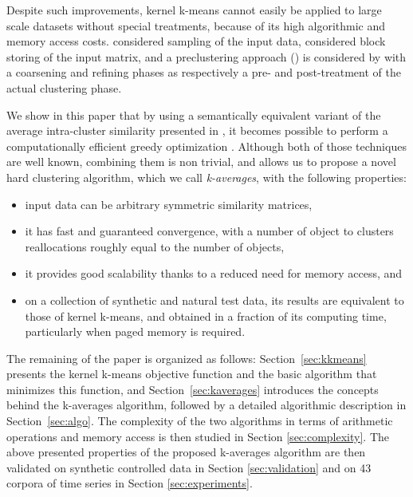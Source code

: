 \documentclass[10pt,journal,compsoc]{IEEEtran}
\begin{document}

Despite such improvements, kernel k-means cannot easily be applied to large scale datasets without special treatments, because of its high algorithmic and memory access costs. 
\cite{Chitta:2011:AKK:2020408.2020558} considered sampling of the input data, \cite{1047453} considered block storing of the input matrix, and a preclustering  approach (\cite{bradley98scaling, conf/icde/GantiRGPF99}) is considered by \cite{Kulis2008} with a coarsening and refining phases as respectively a pre- and post-treatment of the actual clustering phase.

We show in this paper that by using a semantically equivalent variant of the average intra-cluster similarity presented in \cite[Chapter 10.7]{Duda01}, it becomes possible to perform a computationally efficient greedy optimization \cite[Chapter 10.8]{Duda01}. Although both of those techniques are well known, combining them is non trivial, and allows us to propose a novel hard clustering algorithm, which we call \emph{k-averages}, with the following properties: 
\begin{itemize}
\item input data can be arbitrary symmetric similarity matrices,
\item it has fast and guaranteed convergence, with a number of object to clusters reallocations roughly equal to the number of objects,
\item it provides good scalability thanks to a reduced need for memory access, and
\item on a collection of synthetic and natural test data, its results are equivalent to those of kernel k-means, and obtained in a fraction of its computing time, particularly when paged memory is required.
\end{itemize}

The remaining of the paper is organized as follows: Section~\ref{sec:kkmeans} presents the kernel k-means objective function and the basic algorithm that minimizes this function, and Section~\ref{sec:kaverages} introduces the concepts behind the k-averages algorithm, 
followed by a detailed algorithmic description in Section~\ref{sec:algo}. 
The complexity of the two algorithms in terms of arithmetic operations and memory access is then studied in Section \ref{sec:complexity}. The above presented properties of the proposed k-averages algorithm are then validated on synthetic controlled data in Section \ref{sec:validation} and on 43 corpora of time series in Section \ref{sec:experiments}.
\end{document}
